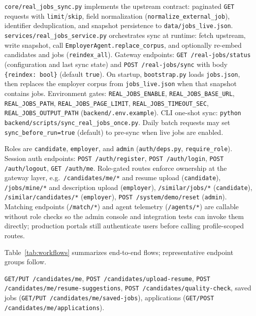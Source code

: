 \texttt{core/real\_jobs\_sync.py} implements the upstream contract: paginated \texttt{GET} requests with \texttt{limit}/\texttt{skip}, field normalization (\texttt{normalize\_external\_job}), identifier deduplication, and snapshot persistence to \texttt{data/jobs\_live.json}.
\texttt{services/real\_jobs\_service.py} orchestrates sync at runtime: fetch upstream, write snapshot, call \texttt{EmployerAgent.replace\_corpus}, and optionally re-embed candidates and jobs (\texttt{reindex\_all}).
Gateway endpoints: \texttt{GET /real-jobs/status} (configuration and last sync state) and \texttt{POST /real-jobs/sync} with body \texttt{\{reindex: bool\}} (default \texttt{true}).
On startup, \texttt{bootstrap.py} loads \texttt{jobs.json}, then replaces the employer corpus from \texttt{jobs\_live.json} when that snapshot contains jobs.
Environment gates: \texttt{REAL\_JOBS\_ENABLE}, \texttt{REAL\_JOBS\_BASE\_URL}, \texttt{REAL\_JOBS\_PATH}, \texttt{REAL\_JOBS\_PAGE\_LIMIT}, \texttt{REAL\_JOBS\_TIMEOUT\_SEC}, \texttt{REAL\_JOBS\_OUTPUT\_PATH} (\texttt{backend/.env.example}).
CLI one-shot sync: \texttt{python backend/scripts/sync\_real\_jobs\_once.py}.
Daily batch requests may set \texttt{sync\_before\_run=true} (default) to pre-sync when live jobs are enabled.

Roles are \texttt{candidate}, \texttt{employer}, and \texttt{admin} (\texttt{auth/deps.py}, \texttt{require\_role}).
Session auth endpoints: \texttt{POST /auth/register}, \texttt{POST /auth/login}, \texttt{POST /auth/logout}, \texttt{GET /auth/me}.
Role-gated routes enforce ownership at the gateway layer, e.g.\ \texttt{/candidates/me/*} and resume upload (\texttt{candidate}), \texttt{/jobs/mine/*} and description upload (\texttt{employer}), \texttt{/similar/jobs/*} (\texttt{candidate}), \texttt{/similar/candidates/*} (\texttt{employer}), \texttt{POST /system/demo/reset} (\texttt{admin}).
Matching endpoints (\texttt{/match/*}) and agent telemetry (\texttt{/agents/*}) are callable without role checks so the admin console and integration tests can invoke them directly; production portals still authenticate users before calling profile-scoped routes.

Table~\ref{tab:workflows} summarizes end-to-end flows; representative endpoint groups follow.

\texttt{GET/PUT /candidates/me}, \texttt{POST /candidates/upload-resume}, \texttt{POST /candidates/me/resume-suggestions}, \texttt{POST /candidates/quality-check}, saved jobs (\texttt{GET/PUT /candidates/me/saved-jobs}), applications (\texttt{GET/POST /candidates/me/applications}).

